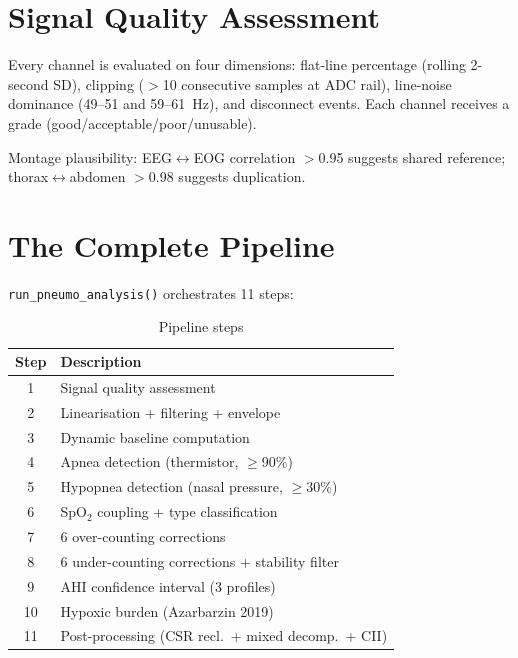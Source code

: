 \documentclass[11pt,a4paper]{article}
\begin{document}
\section{Signal Quality Assessment}

Every channel is evaluated on four dimensions: flat-line percentage
(rolling 2-second SD), clipping ($>$10 consecutive samples at ADC rail),
line-noise dominance (49--51 and 59--61~Hz), and disconnect events.
Each channel receives a grade (good/acceptable/poor/unusable).

Montage plausibility: EEG$\leftrightarrow$EOG correlation $>$0.95
suggests shared reference; thorax$\leftrightarrow$abdomen $>$0.98
suggests duplication.

\section{The Complete Pipeline}

\texttt{run\_pneumo\_analysis()} orchestrates 11 steps:

\begin{table}[H]
\centering\small
\caption{Pipeline steps}
\begin{tabular}{@{}cl@{}}
\toprule
\textbf{Step} & \textbf{Description} \\
\midrule
1  & Signal quality assessment \\
2  & Linearisation + filtering + envelope \\
3  & Dynamic baseline computation \\
4  & Apnea detection (thermistor, $\geq$90\%) \\
5  & Hypopnea detection (nasal pressure, $\geq$30\%) \\
6  & SpO$_2$ coupling + type classification \\
7  & 6 over-counting corrections \\
8  & 6 under-counting corrections + stability filter \\
9  & AHI confidence interval (3 profiles) \\
10 & Hypoxic burden (Azarbarzin 2019) \\
11 & Post-processing (CSR recl.\ + mixed decomp.\ + CII) \\
\bottomrule
\end{tabular}
\end{table}
\end{document}
